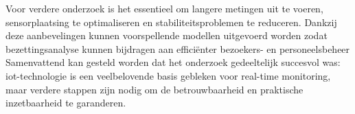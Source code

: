 Voor verdere onderzoek is het essentieel om langere metingen uit te voeren, sensorplaatsing te optimaliseren en stabiliteitsproblemen te reduceren. Dankzij deze aanbevelingen kunnen voorspellende modellen uitgevoerd worden zodat bezettingsanalyse kunnen bijdragen aan efficiënter bezoekers- en personeelsbeheer \\

Samenvattend kan gesteld worden dat het onderzoek gedeeltelijk succesvol was: \gls{iot}-technologie is een veelbelovende basis gebleken voor real-time monitoring, maar verdere stappen zijn nodig om de betrouwbaarheid en praktische inzetbaarheid te garanderen.




\printglossaries







